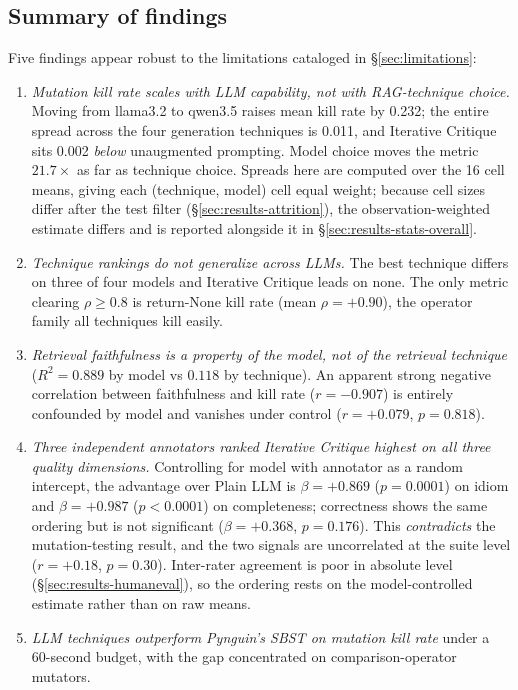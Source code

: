 \documentclass[smallextended]{svjour3}
\begin{document}
\subsection{Summary of findings}\label{sec:results-summary}

Five findings appear robust to the limitations cataloged in
\S\ref{sec:limitations}:

\begin{enumerate}
\item \emph{Mutation kill rate scales with LLM capability, not with
 RAG-technique choice.} Moving from llama3.2 to qwen3.5 raises mean
 kill rate by 0.232; the entire spread across the four generation
 techniques is 0.011, and Iterative Critique sits 0.002 \emph{below}
 unaugmented prompting. Model choice moves the metric
 $21.7\times$ as far as technique choice. Spreads here are computed over
 the 16 cell means, giving each (technique, model) cell equal weight;
 because cell sizes differ after the test filter
 (\S\ref{sec:results-attrition}), the observation-weighted estimate
 differs and is reported alongside it in
 \S\ref{sec:results-stats-overall}.
\item \emph{Technique rankings do not generalize across LLMs.} The best
 technique differs on three of four models and Iterative Critique
 leads on none. The only metric clearing $\rho \geq 0.8$ is
 return-None kill rate (mean $\rho = +0.90$), the operator family
 all techniques kill easily.
\item \emph{Retrieval faithfulness is a property of the model, not
 of the retrieval technique} ($R^2 = 0.889$ by model vs $0.118$ by
 technique). An apparent strong negative correlation between
 faithfulness and kill rate ($r = -0.907$) is entirely confounded
 by model and vanishes under control ($r = +0.079$, $p = 0.818$).
\item \emph{Three independent annotators ranked Iterative Critique
 highest on all three quality dimensions.} Controlling for model
 with annotator as a random intercept, the advantage over Plain LLM
 is $\beta = +0.869$ ($p = 0.0001$) on idiom and $\beta = +0.987$
 ($p < 0.0001$) on completeness; correctness shows the same ordering
 but is not significant ($\beta = +0.368$, $p = 0.176$). This
 \emph{contradicts} the mutation-testing result, and the two signals
 are uncorrelated at the suite level ($r = +0.18$, $p = 0.30$).
 Inter-rater agreement is poor in absolute level
 (\S\ref{sec:results-humaneval}), so the ordering rests on the
 model-controlled estimate rather than on raw means.
\item \emph{LLM techniques outperform Pynguin's SBST on mutation kill
 rate} under a 60-second budget, with the gap concentrated on
 comparison-operator mutators.
\end{enumerate}
\end{document}
